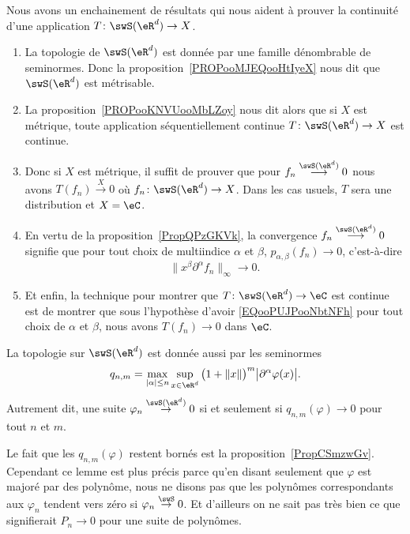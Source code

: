 \begin{normaltext}      \label{NORMooVQESooRwJShl}
	Nous avons un enchainement de résultats qui nous aident à prouver la continuité d'une application \( T\colon \swS(\eR^d)\to X\).
	\begin{enumerate}
		\item
		      La topologie de \( \swS(\eR^d)\) est donnée par une famille dénombrable de seminormes. Donc la proposition~\ref{PROPooMJEQooHtIyeX} nous dit que \( \swS(\eR^d)\) est métrisable.
		\item
		      La proposition~\ref{PROPooKNVUooMbLZoy} nous dit alors que si \( X\) est métrique, toute application séquentiellement continue \( T\colon \swS(\eR^d)\to X\) est continue.
		\item
		      Donc si \( X\) est métrique, il suffit de prouver que pour \( f_n\stackrel{\swS(\eR^d)}{\longrightarrow}0\) nous avons \( T(f_n)\stackrel{X}{\longrightarrow} 0\) où \( f_n\colon \swS(\eR^d)\to X\). Dans les cas usuels, \( T\) sera une distribution et \( X=\eC\).
		\item
		      En vertu de la proposition~\ref{PropQPzGKVk}, la convergence \( f_n\stackrel{\swS(\eR^d)}{\longrightarrow}0\) signifie que pour tout choix de multiindice \( \alpha\) et \( \beta\),  \( p_{\alpha,\beta}(f_n)\to 0\), c'est-à-dire
		      \begin{equation}        \label{EQooPUJPooNbtNFh}
			      \| x^{\beta}\partial^{\alpha}f_n \|_{\infty}\to 0.
		      \end{equation}
		\item
		      Et enfin, la technique pour montrer que \( T\colon \swS(\eR^d)\to \eC\) est continue est de montrer que sous l'hypothèse d'avoir \eqref{EQooPUJPooNbtNFh} pour tout choix de \( \alpha\) et \( \beta\), nous avons \( T(f_n)\to 0\) dans \( \eC\).
	\end{enumerate}
\end{normaltext}

\begin{lemma}   \label{LemRJhCbkO}
	La topologie sur \( \swS(\eR^d)\) est donnée aussi par les seminormes
	\begin{equation}
		q_{n,m}=\max_{| \alpha |\leq n}\sup_{x\in \eR^d}\big( 1+\| x \| \big)^m\big| \partial^{\alpha}\varphi(x) \big|.
	\end{equation}
	Autrement dit, une suite \( \varphi_n\stackrel{\swS(\eR^d)}{\to}0\) si et seulement si \( q_{n,m}(\varphi)\to 0\) pour tout \( n\) et \( m\).
\end{lemma}
Le fait que les \( q_{n,m}(\varphi)\) restent bornés est la proposition~\ref{PropCSmzwGv}. Cependant ce lemme est plus précis parce qu'en disant seulement que \( \varphi\) est majoré par des polynôme, nous ne disons pas que les polynômes correspondants aux \( \varphi_n\) tendent vers zéro si \( \varphi_n\stackrel{\swS}{\to}0\). Et d'ailleurs on ne sait pas très bien ce que signifierait \( P_n\to 0\) pour une suite de polynômes.

